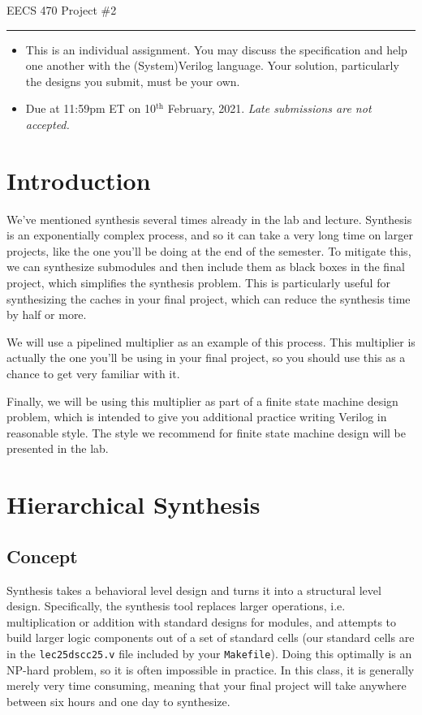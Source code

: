 \documentclass{article}
\newcommand{\shortbar}{
	\vspace*{-12pt}
	\begin{center}
		\rule{5ex}{0.1pt}
	\end{center}
}
\newcommand{\project}[1]{
	\begin{center}
		\LARGE{
			\vspace*{-12pt}
			EECS 470 Project \##1
			\shortbar
		}
	\end{center}
}
\begin{document}
\vspace*{-20pt}
\project{2}

\begin{itemize}
	\item This is an individual assignment. You may discuss the specification
		and help one another with the (System)Verilog language. Your solution,
		particularly the designs you submit, must be your own.
	\item Due at 11:59pm ET on 10$^{\text{th}}$ February, 2021.
		\emph{Late submissions are not accepted.}
\end{itemize}
\hrulefill

\section{Introduction}
We've mentioned synthesis several times already in the lab and lecture.
Synthesis is an exponentially complex process, and so it can take a very long
time on larger projects, like the one you'll be doing at the end of the
semester. To mitigate this, we can synthesize submodules and then include them
as black boxes in the final project, which simplifies the synthesis problem.
This is particularly useful for synthesizing the caches in your final project,
which can reduce the synthesis time by half or more. 

We will use a pipelined multiplier as an example of this process. This
multiplier is actually the one you'll be using in your final project, so you 
should use this as a chance to get very familiar with it. 

Finally, we will be using this multiplier as part of a finite state machine
design problem, which is intended to give you additional practice writing
Verilog in reasonable style. The style we recommend for finite state machine
design will be presented in the lab.

\section{Hierarchical Synthesis}
\subsection{Concept}
Synthesis takes a behavioral level design and turns it into a structural level
design. Specifically, the synthesis tool replaces larger operations, i.e.
multiplication or addition with standard designs for modules, and attempts to
build larger logic components out of a set of standard cells (our standard cells
are in the \texttt{lec25dscc25.v} file included by your \texttt{Makefile}).
Doing this optimally is an NP-hard problem, so it is often impossible in 
practice. In this class, it is generally merely very time consuming, meaning 
that your final project will take anywhere between six hours and one day to 
synthesize. 
\end{document}
